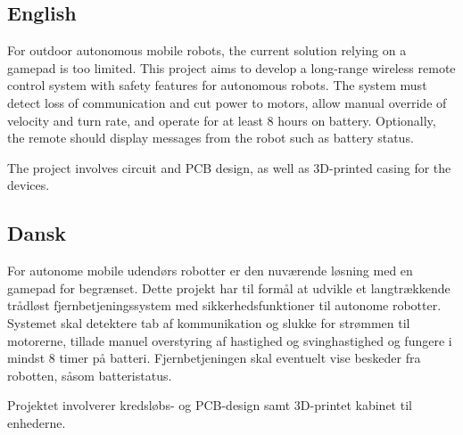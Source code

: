 \subsection*{English}
For outdoor autonomous mobile robots, the current solution relying on a gamepad is too limited. This project aims to develop a long-range wireless remote control system with safety features for autonomous robots. The system must detect loss of communication and cut power to motors, allow manual override of velocity and turn rate, and operate for at least 8 hours on battery. Optionally, the remote should display messages from the robot such as battery status.

The project involves circuit and PCB design, as well as 3D-printed casing for the devices.

\subsection*{Dansk}
For autonome mobile udendørs robotter er den nuværende løsning med en gamepad for begrænset. Dette projekt har til formål at udvikle et langtrækkende trådløst fjernbetjeningssystem med sikkerhedsfunktioner til autonome robotter. Systemet skal detektere tab af kommunikation og slukke for strømmen til motorerne, tillade manuel overstyring af hastighed og svinghastighed og fungere i mindst 8 timer på batteri. Fjernbetjeningen skal eventuelt vise beskeder fra robotten, såsom batteristatus.

Projektet involverer kredsløbs- og PCB-design samt 3D-printet kabinet til enhederne.
